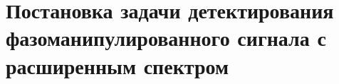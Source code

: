 \section{Постановка задачи детектирования фазоманипулированного сигнала с расширенным спектром}

\newpage
